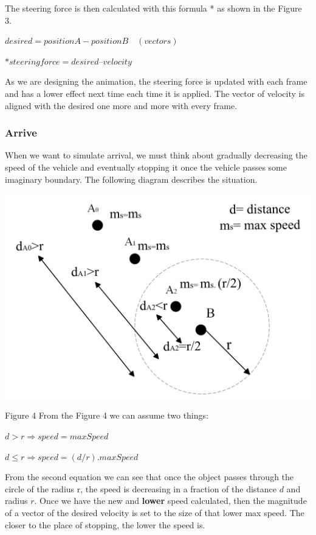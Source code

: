 \documentclass[10pt,twoside,english,a4paper]{article}
\begin{document}
The steering force is then calculated with this formula * as shown 
in the Figure 3.

\begin{center}
$desired =position A - position B \quad (vectors)$ \par
$ *steering force= desired – velocity$

\end{center}

As we are designing the animation, the steering force is updated with 
each frame and has a lower effect next time each time it is applied. 
The vector of velocity is aligned with the desired one
more and more with every frame.

\subsubsection{Arrive} \label{arrive}

When we want to simulate arrival, we must think about gradually 
decreasing the speed of the vehicle and eventually stopping it once the 
vehicle passes some imaginary boundary. The following diagram describes 
the situation. 

\includegraphics[scale=0.22]{diagram_radius.png}\par
Figure 4
\bigbreak
From the Figure 4 we can assume two things: 

\begin{center}
$d>r 	\Rightarrow speed = maxSpeed$ \par 
$d \leq r \Rightarrow speed = (d/r)  . maxSpeed$ 
\end{center} 

From the second equation we can see that once the object passes through
the circle of the radius r, the speed is decreasing in a fraction of 
the distance $d$ and radius $r$. Once we have the new and \textbf{lower} 
speed calculated, then the magnitude of a vector of the desired velocity is set
to the size of that lower max speed. The closer to the place of stopping,
the lower the speed is.
\end{document}
